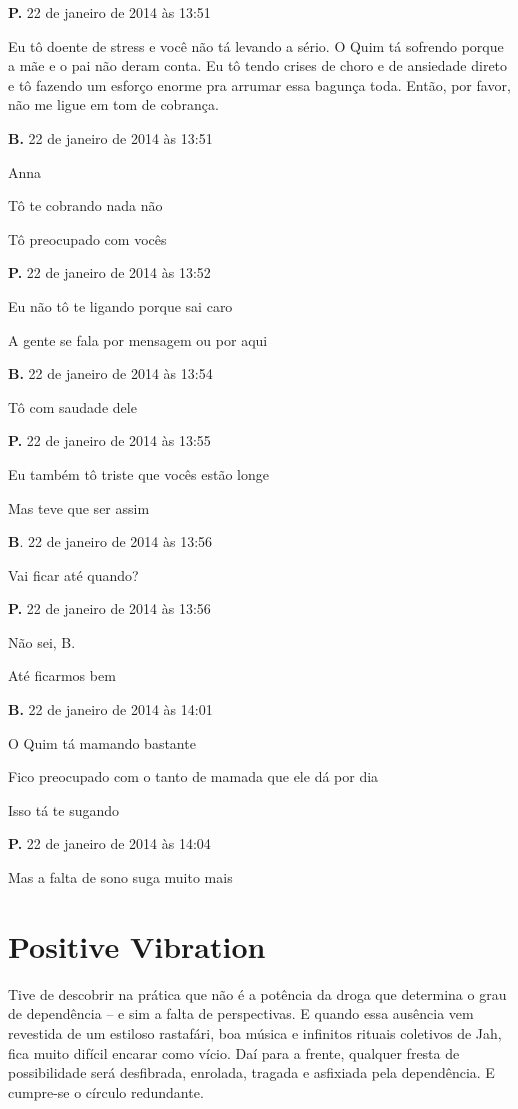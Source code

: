 {\parindent0pt\parskip1pt\raggedright
\textbf{P.} 22 de janeiro de 2014 às 13:51

Eu tô doente de stress e você não tá levando a sério. O Quim tá sofrendo
porque a mãe e o pai não deram conta. Eu tô tendo crises de choro e de
ansiedade direto e tô fazendo um esforço enorme pra arrumar essa bagunça
toda. Então, por favor, não me ligue em tom de cobrança.

\textbf{B.} 22 de janeiro de 2014 às 13:51

Anna

Tô te cobrando nada não

Tô preocupado com vocês

\textbf{P.} 22 de janeiro de 2014 às 13:52

Eu não tô te ligando porque sai caro

A gente se fala por mensagem ou por aqui

\textbf{B.} 22 de janeiro de 2014 às 13:54

Tô com saudade dele

\textbf{P.} 22 de janeiro de 2014 às 13:55

Eu também tô triste que vocês estão longe

Mas teve que ser assim

\textbf{B}. 22 de janeiro de 2014 às 13:56

Vai ficar até quando?

\textbf{P.} 22 de janeiro de 2014 às 13:56

Não sei, B.

Até ficarmos bem

\textbf{B.} 22 de janeiro de 2014 às 14:01

O Quim tá mamando bastante

Fico preocupado com o tanto de mamada que ele dá por dia

Isso tá te sugando

\textbf{P.} 22 de janeiro de 2014 às 14:04

Mas a falta de sono suga muito mais

\chapter{Positive Vibration}

Tive de descobrir na prática que não é a potência da droga que determina
o grau de dependência -- e sim a falta de perspectivas. E quando essa
ausência vem revestida de um estiloso rastafári, boa música e infinitos
rituais coletivos de Jah, fica muito difícil encarar como vício. Daí
para a frente, qualquer fresta de possibilidade será desfibrada,
enrolada, tragada e asfixiada pela dependência. E cumpre-se o círculo
redundante.

}
